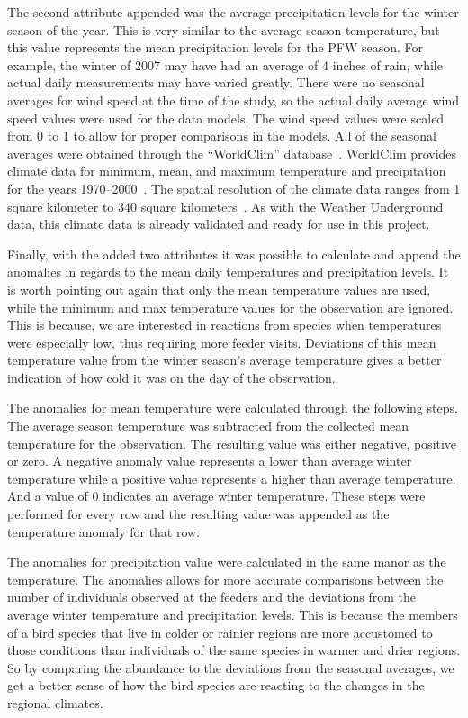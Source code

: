 The second attribute appended was the average precipitation levels for the winter season of the year. This is very similar to the average season temperature, but this value represents the mean precipitation levels for the PFW season. For example, the winter of 2007 may have had an average of 4 inches of rain, while actual daily measurements may have varied greatly. There were no seasonal averages for wind speed at the time of the study, so the actual daily average wind speed values were used for the data models. The wind speed values were scaled from 0 to 1 to allow for proper comparisons in the models. All of the seasonal averages were obtained through the ``WorldClim'' database~\cite{worldclimHome:online}. WorldClim provides climate data for minimum, mean, and maximum temperature and precipitation for the years 1970--2000~\cite{worldclim:online}. The spatial resolution of the climate data ranges from 1 square kilometer to 340 square kilometers~\cite{worldclim:online}. As with the Weather Underground data, this climate data is already validated and ready for use in this project.  

Finally, with the added two attributes it was possible to calculate and append the anomalies in regards to the mean daily temperatures and precipitation levels. It is worth pointing out again that only the mean temperature values are used, while the minimum and max temperature values for the observation are ignored. This is because, we are interested in reactions from species when temperatures were especially low, thus requiring more feeder visits. Deviations of this mean temperature value from the winter season's average temperature gives a better indication of how cold it was on the day of the observation.     

The anomalies for mean temperature were calculated through the following steps. The average season temperature was subtracted from the collected mean temperature for the observation. The resulting value was either negative, positive or zero. A negative anomaly value represents a lower than average winter temperature while a positive value represents a higher than average temperature. And a value of 0 indicates an average winter temperature. These steps were performed for every row and the resulting value was appended as the temperature anomaly for that row.

The anomalies for precipitation value were calculated in the same manor as the temperature. The anomalies allows for more accurate comparisons between the number of individuals observed at the feeders and the deviations from the average winter temperature and precipitation levels. This is because the members of a bird species that live in colder or rainier regions are more accustomed to those conditions than individuals of the same species in warmer and drier regions. So by comparing the abundance to the deviations from the seasonal averages, we get a better sense of how the bird species are reacting to the changes in the regional climates. 


